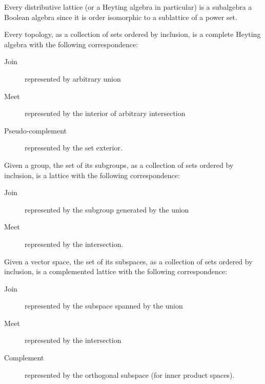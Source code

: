 \documentclass{bareminimum}
\begin{document}
\begin{prop}
	Every distributive lattice (or a Heyting algebra in particular) is a subalgebra a Boolean algebra since it is order isomorphic to a sublattice of a power set.
\end{prop}

\begin{prop}[Topology]
	Every topology, as a collection of sets ordered by inclusion, is a complete Heyting algebra with the following correspondence:
	\begin{description}
		\item[Join] represented by arbitrary union
		\item[Meet] represented by the interior of arbitrary intersection
		\item[Pseudo-complement] represented by the set exterior.
	\end{description}
\end{prop}

\begin{prop}
	Given a group, the set of its subgroups, as a collection of sets ordered by inclusion, is a lattice with the following correspondence:
	\begin{description}
		\item[Join] represented by the subgroup generated by the union
		\item[Meet] represented by the intersection.
	\end{description}
\end{prop}

\begin{prop}
	Given a vector space, the set of its subspaces, as a collection of sets ordered by inclusion, is a complemented lattice with the following correspondence:
	\begin{description}
		\item[Join] represented by the subspace spanned by the union
		\item[Meet] represented by the intersection
		\item[Complement] represented by the orthogonal subspace (for inner product spaces).
	\end{description}
\end{prop}
\end{document}
